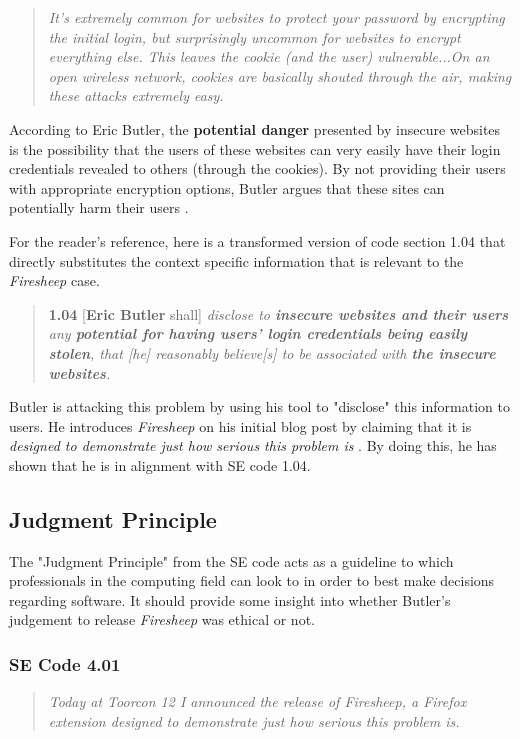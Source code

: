 \documentclass[11pt]{article}
\begin{document}
\begin{multicols}{2}
\begin{quote}
  \emph{It's extremely common for websites to protect your password by encrypting the initial login, but surprisingly uncommon for websites to encrypt everything else. This leaves the cookie (and the user) vulnerable...On an open wireless network, cookies are basically shouted through the air, making these attacks extremely easy.} \cite{codebutler_main}
\end{quote}

According to Eric Butler, the \textbf{potential danger} presented by insecure websites is the possibility that the users of these websites can very easily have their login credentials revealed to others (through the cookies).
By not providing their users with appropriate encryption options, Butler argues that these sites can potentially harm their users \cite{codebutler_main}.

For the reader's reference, here is a transformed version of code section 1.04 that directly substitutes the context specific information that is relevant to the \emph{Firesheep} case.

\begin{quote}
  \textbf{1.04} [\textbf{Eric Butler} shall] \emph{disclose to \textbf{insecure websites and their users} any \textbf{potential for having users' login credentials being easily stolen}, that [he] reasonably believe[s] to be associated with \textbf{the insecure websites}.}
\end{quote}

Butler is attacking this problem by using his tool to "disclose" this information to users. He introduces \emph{Firesheep} on his initial blog post by claiming that it is \emph{designed to demonstrate just how serious this problem is} \cite{codebutler_main}. By doing this, he has shown that he is in alignment with SE code 1.04.

\subsection{Judgment Principle}
The "Judgment Principle" from the SE code acts as a guideline to which professionals in the computing field can look to in order to best make decisions regarding software. It should provide some insight into whether Butler's judgement to release \emph{Firesheep} was ethical or not.

\subsubsection{SE Code 4.01}
\begin{quote}
  \emph{Today at Toorcon 12 I announced the release of Firesheep, a Firefox extension designed to demonstrate just how serious this problem is.} \cite{codebutler_main}
\end{quote}


\end{multicols}
\end{document}
